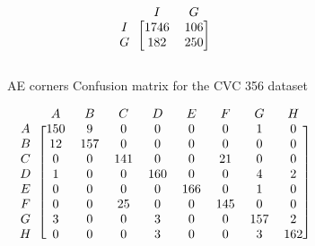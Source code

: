 


\begin{figure}[h]
\myfontsize
\caption*{\footnotesize \textmd{ \textbf{A}:{dyed-lifted-polyps} , \textbf{B}:{dyed-resection-margins} , \textbf{C}:{esophagitis} , \textbf{D}:{normal-cecum} , \textbf{E}:{normal-pylorus} , \textbf{F}:{normal-z-line} , \textbf{G}:{polyps} , \textbf{H}:{ulcerative-colitis} , \textbf{I}:{non-polyp}}}

\begin{subfigure}[b]{0.25\textwidth}
     
\[
\begin{blockarray}{ccc}
& I & G  \\
\begin{block}{c[cc]}
        I&1746 & 106\\
        G&  182 & 250\\
\end{block}
\end{blockarray}
 \]         

\caption{AE corners Confusion matrix for the CVC 356 dataset}
\label{mat:cvc356_CM_DN121_AE_CORNER}
\end{subfigure}
\begin{subfigure}[b]{0.49\textwidth}  
\scriptsize     
\[
\begin{blockarray}{ccccccccc}
& A & B & C & D & E & F & G & H \\
\begin{block}{c[cccccccc]}
A&150 & 9 & 0 & 0 & 0 & 0 & 1 & 0\\
B& 12 & 157 & 0 & 0 & 0 & 0 & 0 & 0\\
C&  0 & 0 & 141 & 0 & 0 & 21 & 0 & 0\\
D&  1 & 0 & 0 & 160 & 0 & 0 & 4 & 2\\
E&  0 & 0 & 0 & 0 & 166 & 0 & 1 & 0\\
F&  0 & 0 & 25 & 0 & 0 & 145 & 0 & 0\\
G&  3 & 0 & 0 & 3 & 0 & 0 & 157 & 2\\
H&  0 & 0 & 0 & 3 & 0 & 0 & 3 & 162\\
\end{block}
\end{blockarray}
 \]        
        

\end{subfigure}
\end{figure}
